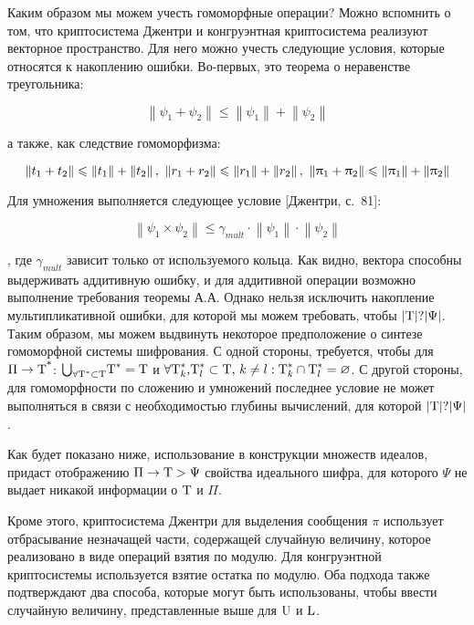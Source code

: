     Каким образом мы можем учесть гомоморфные операции? Можно вспомнить о том, что криптосистема Джентри и конгруэнтная криптосистема реализуют векторное пространство. Для него можно учесть следующие условия, которые относятся к накоплению ошибки. Во-первых, это теорема о неравенстве треугольника:
    
    \[\left\|{\psi }_1+{\psi }_2\right\|\le \left\|{\psi }_1\right\|+\left\|{\psi }_2\right\|\] 
    
    а также, как следствие гомоморфизма:
    
    \[\left\|t_1+t_2\right\|\leqslant \left\|t_1\right\|+\left\|t_2\right\|\textrm{,}~\left\|r_1+r_2\right\|\leqslant \left\|r_1\right\|+\left\|r_2\right\|\textrm{,}\ \left\|{\uppi }_1+{\uppi }_2\right\|\leqslant \left\|{\uppi }_1\right\|+\left\|{\uppi }_2\right\|\] 
    
    Для умножения выполняется следующее условие [Джентри, с.~81]:
    
    \[\left\|{\psi }_1\times {\psi }_2\right\|\le {\gamma }_{mult}\cdot \left\|{\psi }_1\right\|\cdot \left\|{\psi }_2\right\|\] 
    
    , где ${\gamma }_{mult}$ зависит только от используемого кольца. Как видно, вектора способны выдерживать аддитивную ошибку, и для аддитивной операции возможно выполнение требования теоремы А.А. Однако нельзя исключить накопление мультипликативной ошибки, для которой мы можем требовать, чтобы $\left|{\textrm T}\right|?{\textrm |}\Psi {\textrm |}$.
    Таким образом, мы можем выдвинуть некоторое предположение о синтезе гомоморфной системы шифрования. С одной стороны, требуется, чтобы для $\Pi \to {{\textrm T}}^{{\textrm *}}$: ${\bigcup }_{\forall {{\textrm T}}^*\subset {\textrm T}}{{\textrm T}}^*={\textrm T}$ и $\forall {{\textrm T}}^*_k\textrm{,}{{\textrm T}}^*_l\subset {\textrm T}\textrm{,}\ k\ne l:{{\textrm T}}^*_k\cap {{\textrm T}}^*_l=\varnothing $. С другой стороны, для гомоморфности по сложению и умножений последнее условие не может выполняться в связи с необходимостью глубины вычислений, для которой $\left|{\textrm T}\right|?{\textrm |}\Psi {\textrm |}$.
    
    Как будет показано ниже, использование в конструкции множеств идеалов, придаст отображению $\Pi \to {\textrm T}>\Psi $ свойства идеального шифра, для которого  $\Psi $ не выдает никакой информации о ${\textrm T}$ и $\Pi $.
    
    Кроме этого, криптосистема Джентри для выделения сообщения $\pi $ использует отбрасывание незначащей части, содержащей случайную величину, которое реализовано в виде операций взятия по модулю. Для конгруэнтной криптосистемы используется взятие остатка по модулю. Оба подхода также подтверждают два способа, которые могут быть использованы, чтобы ввести случайную величину, представленные выше для ${\textrm U}$ и ${\textrm L}$.
    
